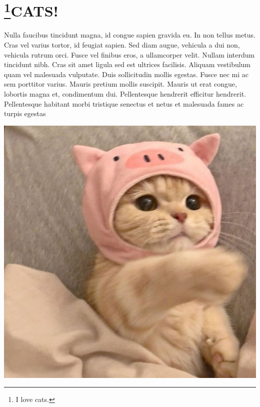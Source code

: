 \documentclass[10pt,a4paper]{report}
\begin{document}
\section{\footnote{I love cats.}CATS!}
Nulla faucibus tincidunt magna, id congue sapien gravida eu. In non tellus metus. Cras vel varius tortor, id feugiat sapien. Sed diam augue, vehicula a dui non, vehicula rutrum orci. Fusce vel finibus eros, a ullamcorper velit. Nullam interdum tincidunt nibh. Cras sit amet ligula sed est ultrices facilisis. Aliquam vestibulum quam vel malesuada vulputate. Duis sollicitudin mollis egestas. Fusce nec mi ac sem porttitor varius. Mauris pretium mollis suscipit. Mauris ut erat congue, lobortis magna et, condimentum dui. Pellentesque hendrerit efficitur hendrerit. Pellentesque habitant morbi tristique senectus et netus et malesuada fames ac turpis egestas \cite{guyon2002gene}
\begin{center}
\end{center}
\includegraphics[width=0.9\linewidth, right]{images/1.jpg}
\clearpage
\end{document}
